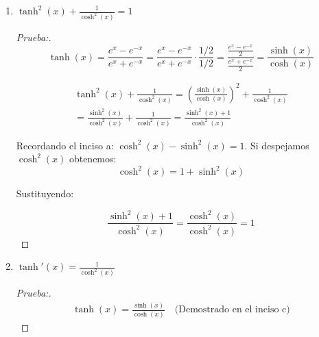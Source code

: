 \documentclass[12pt]{article}
\begin{document}
\begin{enumerate}[\hspace{9px} a)]
    \item \(\tanh^2(x)+\displaystyle\frac{1}{\cosh^2(x)}=1\)
    
    \begin{proof}[Prueba:]
        \begin{equation*}
            \tanh(x) = \frac{e^x-e^{-x}}{e^x+e^{-x}} = \frac{e^x-e^{-x}}{e^x+e^{-x}}\cdot\frac{1/2}{1/2} = \frac{\displaystyle\frac{e^x-e^{-x}}{2}}{\displaystyle\frac{e^x+e^{-x}}{2}} = \frac{\sinh(x)}{\cosh(x)}
        \end{equation*}

        \begin{multline*}
            \tanh^2(x)+\frac{1}{\cosh^2(x)} = \left(\frac{\sinh(x)}{\cosh(x)}\right)^2+\frac{1}{\cosh^2(x)} \\ = \frac{\sinh^2(x)}{\cosh^2(x)}+\frac{1}{\cosh^2(x)} = \frac{\sinh^2(x)+1}{\cosh^2(x)}
        \end{multline*}

        Recordando el inciso a: \(\cosh^2(x)-\sinh^2(x)=1\). Si despejamos \(\cosh^2(x)\) obtenemos: 
        \[\cosh^2(x) = 1+\sinh^2(x)\]

        Sustituyendo:

        \begin{equation*}
            \frac{\sinh^2(x)+1}{\cosh^2(x)} = \frac{\cosh^2(x)}{\cosh^2(x)} = 1
        \end{equation*}
    \end{proof}

    \item \(\tanh'(x)=\displaystyle\frac{1}{\cosh^2(x)}\)
    
    \begin{proof}[Prueba:]
        \begin{align*}
            \tanh(x)=\frac{\sinh(x)}{\cosh(x)} \quad \text{(Demostrado en el inciso c)}
        \end{align*}


\end{proof}
\end{enumerate}
\end{document}
